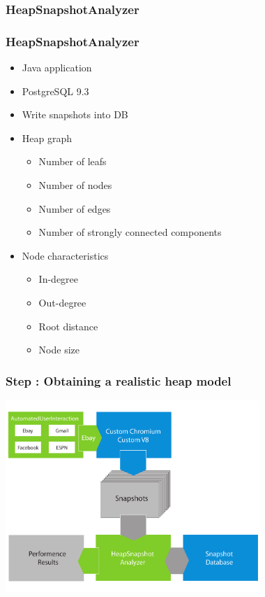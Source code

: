 \subsubsection{HeapSnapshotAnalyzer}
\begin{frame}
	\frametitle{HeapSnapshotAnalyzer}
	\begin{itemize}
		\item Java application
		\item PostgreSQL 9.3
		\item Write snapshots into DB
			
		\pause
			
		\item Heap graph
		\begin{itemize}
			 \item Number of leafs
			 \item Number of nodes
			 \item Number of edges
			 \item Number of strongly connected components
		\end{itemize}
			
		\pause 
			
		\item Node characteristics
		\begin{itemize} 
			 \item In-degree
			 \item Out-degree
			 \item Root distance
			 \item Node size 
		\end{itemize}
	\end{itemize} 
\end{frame}
	
\begin{frame}
	\frametitle{Step \theStepCounter: Obtaining a realistic heap model}		
	\includegraphics[width=26em]{../imgs/solution_h.pdf}
\end{frame}
	
